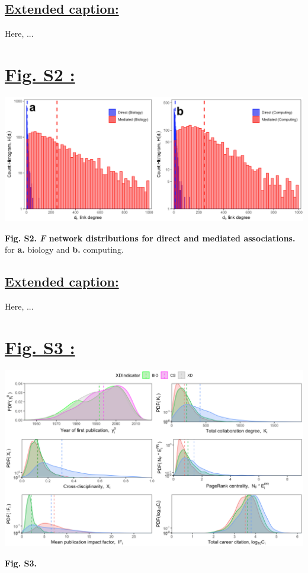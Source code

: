 \documentclass{article}\usepackage[]{graphicx}\usepackage[]{color}
\begin{document}
\subsection*{\underline{Extended caption:}}
\par{Here, ...}

\newpage
\section*{\underline{Fig. S2 :}}
\begin{center}
\includegraphics[scale=0.45]{S2.png}
\newline
\par{\textbf{Fig. S2. \textit{F} network distributions for direct and mediated associations.} for \textbf{a.} biology and \textbf{b.} computing.}
\end{center}
\subsection*{\underline{Extended caption:}}
\par{Here, ...}

\newpage
\section*{\underline{Fig. S3 :}}
\begin{center}
\includegraphics[scale=0.4]{3_ggplot.png}
\newline
\par{\textbf{Fig. S3.}}
\end{center}
\end{document}

